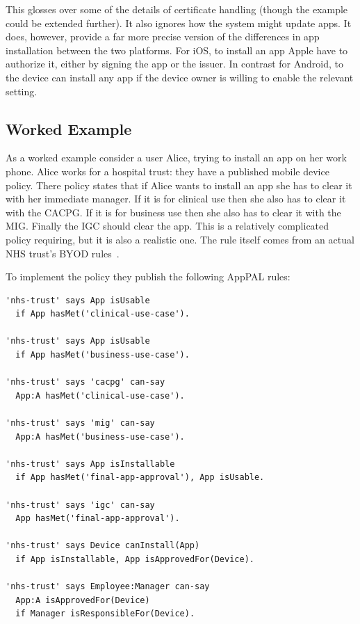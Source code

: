 \documentclass[thesis.tex]{subfiles}
\begin{document}
This glosses over some of the details of certificate handling (though the
example could be extended further). It also ignores how the system might update
apps. It does, however, provide a far more precise version of the differences in
app installation between the two platforms. For iOS, to install an app Apple
have to authorize it, either by signing the app or the issuer. In contrast for
Android, to the device can install any app if the device owner is willing to
enable the relevant setting.


\subsection{Worked Example}

As a worked example consider a user Alice, trying to install an app on her work phone.
Alice works for a hospital trust: they have a published mobile device policy.%
There policy states that if Alice wants to install an app she has to clear it with her immediate manager.
If it is for clinical use then she also has to clear it with the \ac{CACPG}.
If it is for business use then she also has to clear it with the \ac{MIG}.
Finally the \ac{IGC} should clear the app.
This is a relatively complicated policy requiring, but it is also a realistic one.
The rule itself comes from an actual NHS trust's BYOD rules~\cite{kennington_mobiles_2014}.

To implement the policy they publish the following AppPAL rules:
\begin{lstlisting}
'nhs-trust' says App isUsable
  if App hasMet('clinical-use-case').

'nhs-trust' says App isUsable
  if App hasMet('business-use-case').

'nhs-trust' says 'cacpg' can-say
  App:A hasMet('clinical-use-case').

'nhs-trust' says 'mig' can-say
  App:A hasMet('business-use-case').

'nhs-trust' says App isInstallable
  if App hasMet('final-app-approval'), App isUsable.

'nhs-trust' says 'igc' can-say
  App hasMet('final-app-approval').

'nhs-trust' says Device canInstall(App)
  if App isInstallable, App isApprovedFor(Device).

'nhs-trust' says Employee:Manager can-say
  App:A isApprovedFor(Device)
  if Manager isResponsibleFor(Device).
\end{lstlisting}
\end{document}
